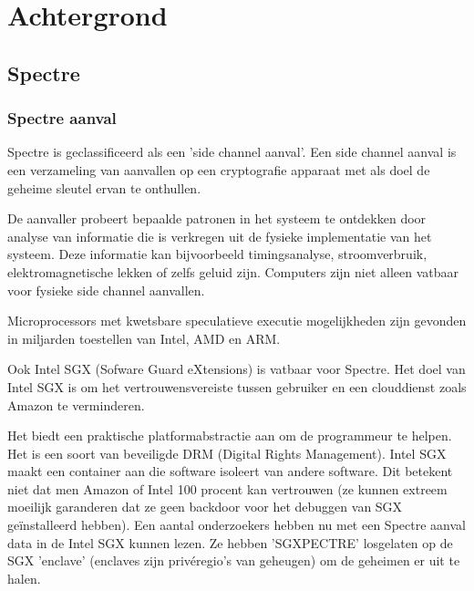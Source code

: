 \autocite{Redhat2018}







\chapter{Achtergrond}



\section{Spectre}

\subsection{Spectre aanval}
Spectre is geclassificeerd als een 'side channel aanval'.
Een side channel aanval is een verzameling van aanvallen op een cryptografie apparaat met als doel de geheime sleutel ervan te onthullen.

De aanvaller probeert bepaalde patronen in het systeem te ontdekken door analyse van informatie die is verkregen uit de fysieke implementatie van het systeem. Deze informatie kan bijvoorbeeld timingsanalyse, stroomverbruik, elektromagnetische lekken of zelfs geluid zijn. \parencite{Touhafi2011}
Computers zijn niet alleen vatbaar voor fysieke side channel aanvallen.

Microprocessors met kwetsbare speculatieve executie mogelijkheden zijn gevonden in miljarden toestellen van Intel, AMD en ARM.

Ook Intel SGX (Sofware Guard eXtensions) is vatbaar voor Spectre. 
Het doel van Intel SGX is om het vertrouwensvereiste tussen gebruiker en een clouddienst zoals Amazon te verminderen.

Het biedt een praktische platformabstractie aan om de programmeur te helpen. 
Het is een soort van beveiligde DRM (Digital Rights Management).
Intel SGX maakt een container aan die software isoleert van andere software.
Dit betekent niet dat men Amazon of Intel 100 procent kan vertrouwen (ze kunnen extreem moeilijk garanderen dat ze geen backdoor voor het debuggen van SGX geïnstalleerd hebben).
Een aantal onderzoekers hebben nu met een Spectre aanval data in de Intel SGX kunnen lezen.
Ze hebben 'SGXPECTRE'  losgelaten op de SGX 'enclave' (enclaves zijn privéregio's van geheugen) om de geheimen er uit te halen.

